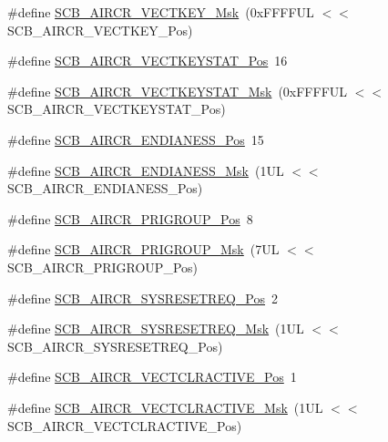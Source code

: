 \begin{DoxyCompactItemize}
\item 
\#define \hyperlink{group___c_m_s_i_s___s_c_b_ga90c7cf0c490e7ae55f9503a7fda1dd22}{S\+C\+B\+\_\+\+A\+I\+R\+C\+R\+\_\+\+V\+E\+C\+T\+K\+E\+Y\+\_\+\+Msk}~(0x\+F\+F\+F\+F\+U\+L $<$$<$ S\+C\+B\+\_\+\+A\+I\+R\+C\+R\+\_\+\+V\+E\+C\+T\+K\+E\+Y\+\_\+\+Pos)
\item 
\#define \hyperlink{group___c_m_s_i_s___s_c_b_gaec404750ff5ca07f499a3c06b62051ef}{S\+C\+B\+\_\+\+A\+I\+R\+C\+R\+\_\+\+V\+E\+C\+T\+K\+E\+Y\+S\+T\+A\+T\+\_\+\+Pos}~16
\item 
\#define \hyperlink{group___c_m_s_i_s___s_c_b_gabacedaefeefc73d666bbe59ece904493}{S\+C\+B\+\_\+\+A\+I\+R\+C\+R\+\_\+\+V\+E\+C\+T\+K\+E\+Y\+S\+T\+A\+T\+\_\+\+Msk}~(0x\+F\+F\+F\+F\+U\+L $<$$<$ S\+C\+B\+\_\+\+A\+I\+R\+C\+R\+\_\+\+V\+E\+C\+T\+K\+E\+Y\+S\+T\+A\+T\+\_\+\+Pos)
\item 
\#define \hyperlink{group___c_m_s_i_s___s_c_b_gad31dec98fbc0d33ace63cb1f1a927923}{S\+C\+B\+\_\+\+A\+I\+R\+C\+R\+\_\+\+E\+N\+D\+I\+A\+N\+E\+S\+S\+\_\+\+Pos}~15
\item 
\#define \hyperlink{group___c_m_s_i_s___s_c_b_ga2f571f93d3d4a6eac9a3040756d3d951}{S\+C\+B\+\_\+\+A\+I\+R\+C\+R\+\_\+\+E\+N\+D\+I\+A\+N\+E\+S\+S\+\_\+\+Msk}~(1\+U\+L $<$$<$ S\+C\+B\+\_\+\+A\+I\+R\+C\+R\+\_\+\+E\+N\+D\+I\+A\+N\+E\+S\+S\+\_\+\+Pos)
\item 
\#define \hyperlink{group___c_m_s_i_s___s_c_b_gaca155deccdeca0f2c76b8100d24196c8}{S\+C\+B\+\_\+\+A\+I\+R\+C\+R\+\_\+\+P\+R\+I\+G\+R\+O\+U\+P\+\_\+\+Pos}~8
\item 
\#define \hyperlink{group___c_m_s_i_s___s_c_b_ga8be60fff03f48d0d345868060dc6dae7}{S\+C\+B\+\_\+\+A\+I\+R\+C\+R\+\_\+\+P\+R\+I\+G\+R\+O\+U\+P\+\_\+\+Msk}~(7\+U\+L $<$$<$ S\+C\+B\+\_\+\+A\+I\+R\+C\+R\+\_\+\+P\+R\+I\+G\+R\+O\+U\+P\+\_\+\+Pos)
\item 
\#define \hyperlink{group___c_m_s_i_s___s_c_b_gaffb2737eca1eac0fc1c282a76a40953c}{S\+C\+B\+\_\+\+A\+I\+R\+C\+R\+\_\+\+S\+Y\+S\+R\+E\+S\+E\+T\+R\+E\+Q\+\_\+\+Pos}~2
\item 
\#define \hyperlink{group___c_m_s_i_s___s_c_b_gaae1181119559a5bd36e62afa373fa720}{S\+C\+B\+\_\+\+A\+I\+R\+C\+R\+\_\+\+S\+Y\+S\+R\+E\+S\+E\+T\+R\+E\+Q\+\_\+\+Msk}~(1\+U\+L $<$$<$ S\+C\+B\+\_\+\+A\+I\+R\+C\+R\+\_\+\+S\+Y\+S\+R\+E\+S\+E\+T\+R\+E\+Q\+\_\+\+Pos)
\item 
\#define \hyperlink{group___c_m_s_i_s___s_c_b_gaa30a12e892bb696e61626d71359a9029}{S\+C\+B\+\_\+\+A\+I\+R\+C\+R\+\_\+\+V\+E\+C\+T\+C\+L\+R\+A\+C\+T\+I\+V\+E\+\_\+\+Pos}~1
\item 
\#define \hyperlink{group___c_m_s_i_s___s_c_b_ga212c5ab1c1c82c807d30d2307aa8d218}{S\+C\+B\+\_\+\+A\+I\+R\+C\+R\+\_\+\+V\+E\+C\+T\+C\+L\+R\+A\+C\+T\+I\+V\+E\+\_\+\+Msk}~(1\+U\+L $<$$<$ S\+C\+B\+\_\+\+A\+I\+R\+C\+R\+\_\+\+V\+E\+C\+T\+C\+L\+R\+A\+C\+T\+I\+V\+E\+\_\+\+Pos)

\end{DoxyCompactItemize}
